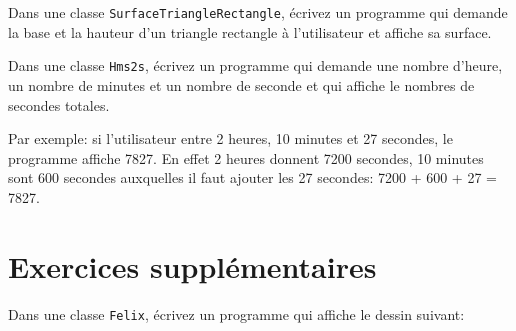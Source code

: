 \documentclass[a4paper,11pt]{article}
\begin{document}
		Dans une classe \texttt{SurfaceTriangleRectangle}, écrivez un programme qui demande 
		la base et la hauteur d'un triangle rectangle à l'utilisateur et affiche sa surface.

		Dans une classe \texttt{Hms2s}, écrivez un programme qui demande 
		une nombre d'heure, un nombre de minutes et un nombre de seconde
		et qui affiche le nombres de secondes totales.
		
		Par exemple: si l'utilisateur entre 2 heures, 10 minutes et 27 secondes, le programme affiche
		7827. En effet 2 heures donnent 7200 secondes, 10 minutes sont 600 secondes 
		auxquelles il faut ajouter les 27 secondes: 7200 + 600 + 27 = 7827. 




\section{Exercices supplémentaires}


	\newpage
	\Exercice{}
		Dans une classe \texttt{Felix}, écrivez un programme qui affiche le dessin suivant:
\end{document}
